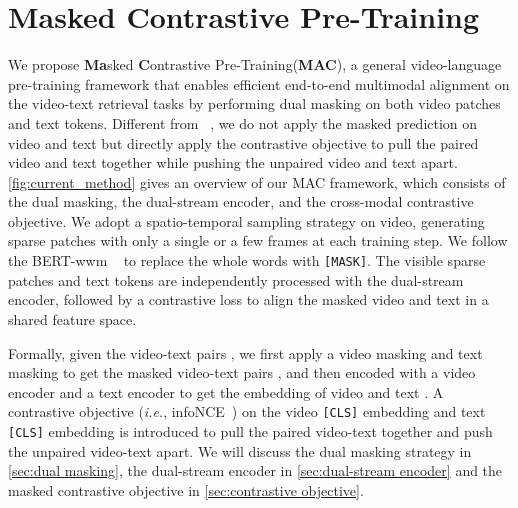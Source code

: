 \documentclass[10pt,twocolumn,letterpaper]{article}
\begin{document}
\vspace{-1mm}\section{Masked Contrastive Pre-Training}
\label{sec:method}
We propose \textbf{Ma}sked \textbf{C}ontrastive Pre-Training(\textbf{MAC}), a general video-language pre-training framework that enables efficient end-to-end multimodal alignment on the video-text retrieval tasks by performing dual masking on both video patches and text tokens. Different from ~\cite{mae, beit, videomae, st_mae}, we do not apply the masked prediction on video and text but directly apply the contrastive objective to pull the paired video and text together while pushing the unpaired video and text apart. \cref{fig:current_method} gives an overview of our MAC framework, which consists of the dual masking, the dual-stream encoder, and the cross-modal contrastive objective. We adopt a spatio-temporal sampling strategy on video, generating sparse patches with only a single or a few frames at each training step. We follow the BERT-wwm ~\cite{bert-www} to replace the whole words with \verb+[MASK]+. The visible sparse patches and text tokens are independently processed with the dual-stream encoder, followed by a contrastive loss to align the masked video and text in a shared feature space.

Formally, given the video-text pairs , we first apply a video masking  and text masking  to get the masked video-text pairs , and then encoded with a video encoder  and a text encoder  to get the embedding of video  and text . A contrastive objective (\emph{i.e.}, infoNCE~\cite{cpc_infonce}) on the video \verb+[CLS]+ embedding  and text \verb+[CLS]+ embedding  is introduced to pull the paired video-text together and push the unpaired video-text apart. We will discuss the dual masking strategy in \cref{sec:dual masking}, the dual-stream encoder in \cref{sec:dual-stream encoder} and the masked contrastive objective in \cref{sec:contrastive objective}.
\end{document}
